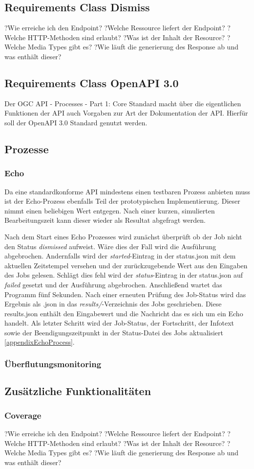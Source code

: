 \subsection{Requirements Class Dismiss}
?Wie erreiche ich den Endpoint?
?Welche Ressource liefert der Endpoint?
?Welche HTTP-Methoden sind erlaubt?
?Was ist der Inhalt der Resource?
?Welche Media Types gibt es?
?Wie läuft die generierung des Response ab und was enthält dieser?
\subsection{Requirements Class OpenAPI 3.0}
Der OGC API - Processes - Part 1: Core Standard macht über die eigentlichen Funktionen der API auch Vorgaben zur Art der Dokumentation der API. Hierfür soll der 
OpenAPI 3.0 Standard genutzt werden. 
\subsection{Prozesse}
\subsubsection{Echo}
Da eine standardkonforme API mindestens einen testbaren Prozess anbieten muss ist der Echo-Prozess ebenfalls Teil der prototypischen Implementierung. 
Dieser nimmt einen beliebigen Wert entgegen. Nach einer kurzen, simulierten Bearbeitungszeit kann dieser wieder als Resultat abgefragt werden. 

Nach dem Start eines Echo Prozesses wird zunächst überprüft ob der Job nicht den Status \textit{dismissed} aufweist. Wäre dies der Fall wird die Ausführung abgebrochen. 
Andernfalls wird der \textit{started}-Eintrag in der status.json mit dem aktuellen Zeitstempel versehen und der zurückzugebende Wert aus den Eingaben des Jobs gelesen.
Schlägt dies fehl wird der \textit{status}-Eintrag in der status.json auf \textit{failed} gesetzt und der Ausführung abgebrochen. 
Anschließend wartet das Programm fünf Sekunden. Nach einer erneuten Prüfung des Job-Status wird das Ergebnis als .json in das \textit{results/}-Verzeichnis des Jobs geschrieben.
Diese results.json enthält den Eingabewert und die Nachricht das es sich um ein Echo handelt. 
Als letzter Schritt wird der Job-Status, der Fortschritt, der Infotext sowie der Beendigungszeitpunkt in der Status-Datei des Jobs aktualisiert \ref{appendixEchoProcess}. 
\subsubsection{Überflutungsmonitoring}
\subsection{Zusätzliche Funktionalitäten}
\subsubsection{Coverage} 
?Wie erreiche ich den Endpoint?
?Welche Ressource liefert der Endpoint?
?Welche HTTP-Methoden sind erlaubt?
?Was ist der Inhalt der Resource?
?Welche Media Types gibt es?
?Wie läuft die generierung des Response ab und was enthält dieser?